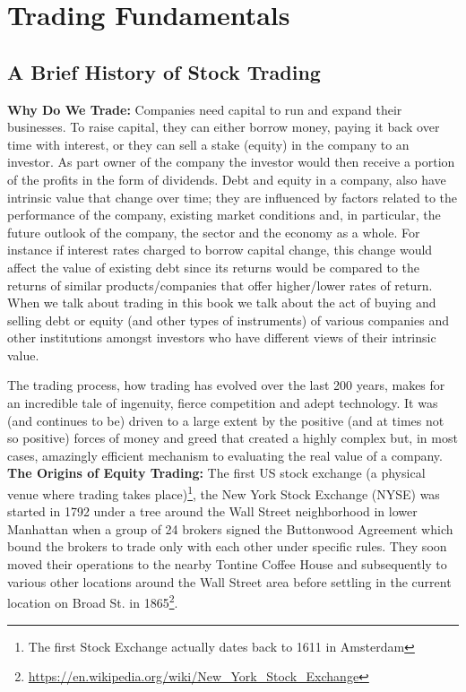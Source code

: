 \chapter{Trading Fundamentals}\label{chap:ch_trading_fund}
\section{A Brief History of Stock Trading}

\noindent\textbf{Why Do We Trade:} Companies need capital to run and expand their businesses. To raise capital, they can either borrow money, paying it back over time with interest, or they can sell a stake (equity) in the company to an investor. As part owner of the company the investor would then receive a portion of the profits in the form of dividends. Debt and equity in a company, also have intrinsic value that change over time; they are influenced by factors related to the performance of the company, existing market conditions and, in particular, the future outlook of the company, the sector and the economy as a whole. For instance if interest rates charged to borrow capital change, this change would affect the value of existing debt since its returns would be compared to the returns of similar products/companies that offer higher/lower rates of return. When we talk about trading in this book we talk about the act of buying and selling debt or equity (and other types of instruments) of various companies and other institutions amongst investors who have different views of their intrinsic value.


The trading process, how trading has evolved over the last 200 years, makes for an incredible tale of ingenuity, fierce competition and adept technology. It was (and continues to be) driven to a large extent by the positive (and at times not so positive) forces of money and greed that created a highly complex but, in most cases, amazingly efficient mechanism to evaluating the real value of a company. \\


\noindent\textbf{The Origins of Equity Trading:} The first US stock exchange (a physical venue where trading takes place)\footnote{The first Stock Exchange actually dates back to 1611 in Amsterdam}, the New York Stock Exchange (NYSE) was started in 1792 under a tree around the Wall Street neighborhood in lower Manhattan when a group of 24 brokers signed the Buttonwood Agreement which bound the brokers to trade only with each other under specific rules. They soon moved their operations to the nearby Tontine Coffee House and subsequently to various other locations around the Wall Street area before settling in the current location on Broad St. in 1865\footnote{\url{https://en.wikipedia.org/wiki/New_York_Stock_Exchange}}.\\



